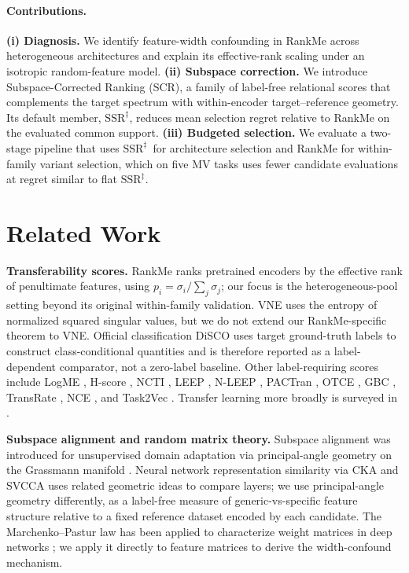 \documentclass{article}
\newcommand{\SSRdag}{\ensuremath{\mathrm{SSR}^{\ddagger}}\xspace}
\begin{document}
\paragraph{Contributions.}
\textbf{(i) Diagnosis.} We identify feature-width confounding in RankMe across heterogeneous architectures and explain its effective-rank scaling under an isotropic random-feature model.
\textbf{(ii) Subspace correction.} We introduce Subspace-Corrected Ranking (SCR), a family of label-free relational scores that complements the target spectrum with within-encoder target--reference geometry. Its default member, \SSRdag, reduces mean selection regret relative to RankMe on the evaluated common support.
\textbf{(iii) Budgeted selection.} We evaluate a two-stage pipeline that uses \SSRdag\ for architecture selection and RankMe for within-family variant selection, which on five MV tasks uses fewer candidate evaluations at regret similar to flat \SSRdag.

\section{Related Work}
\label{sec:related}

\textbf{Transferability scores.} RankMe \citep{garrido2023rankme} ranks pretrained encoders by the effective rank of penultimate features, using $p_i=\sigma_i/\sum_j\sigma_j$; our focus is the heterogeneous-pool setting beyond its original within-family validation. VNE \citep{kim2023vne} uses the entropy of normalized squared singular values, but we do not extend our RankMe-specific theorem to VNE. Official classification DiSCO \citep{zhang2025disco} uses target ground-truth labels to construct class-conditional quantities and is therefore reported as a label-dependent comparator, not a zero-label baseline. Other label-requiring scores include LogME \citep{zhang2021logme}, H-score \citep{bao2019hscore}, NCTI \citep{wang2023ncti}, LEEP \citep{nguyen2020leep}, N-LEEP \citep{li2021nleep}, PACTran \citep{ding2022pactran}, OTCE \citep{tan2021otce}, GBC \citep{pandy2022gbc}, TransRate \citep{huang2022transrate}, NCE \citep{tran2019nce}, and Task2Vec \citep{achille2019task2vec}. Transfer learning more broadly is surveyed in \citet{pan2010transfer}.

\textbf{Subspace alignment and random matrix theory.}  Subspace alignment \citep{fernando2013sa} was introduced for unsupervised domain adaptation via principal-angle geometry on the Grassmann manifold \citep{hamm2008grassmann}.  Neural network representation similarity via CKA and SVCCA \citep{kornblith2019similarity,raghu2017svcca} uses related geometric ideas to compare layers; we use principal-angle geometry differently, as a label-free measure of generic-vs-specific feature structure relative to a fixed reference dataset encoded by each candidate.  The Marchenko--Pastur law \citep{marchenko1967distribution} has been applied to characterize weight matrices in deep networks \citep{martin2021implicit}; we apply it directly to feature matrices to derive the width-confound mechanism.
\end{document}
